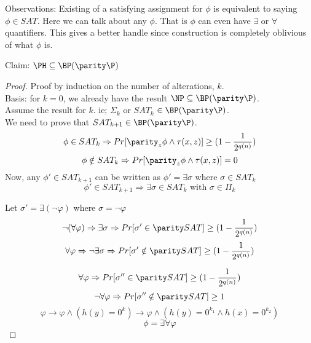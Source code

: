 \documentclass[11pt]{article}
\begin{document}
Observations: Existing of a satisfying assignment for $\phi$ is
equivalent to saying $\phi\in SAT$. Here we can talk about any
$\phi$. That is $\phi$ can even have $\exists$ or $\forall$
quantifiers. This gives a better handle since construction is
completely oblivious of what $\phi$ is.

Claim: $\PH\subseteq\BP(\parity\P)$
\begin{proof} Proof by induction on the number of alterations, $k$.\\
  Basis: for $k=0$, we already have the result
  $\NP\subseteq\BP(\parity\P)$.\\ Assume the result for $k$. ie;
  $\Sigma_k$ or $SAT_k$ $\in \BP(\parity\P)$.\\ We need to prove that
  $SAT_{k+1}\in \BP(\parity\P)$.
$$\phi\in SAT_k\Rightarrow Pr[\parity_z\phi\land\tau(x,z)]\geq(1-\frac{1}{2^{q(n)}})$$
$$\phi\notin SAT_k\Rightarrow Pr[\parity_z\phi\land\tau(x,z)]=0$$
Now, any $\phi '\in SAT_{k+1}$ can be written as $\phi
'=\exists\sigma$ where $\sigma\in SAT_k$
$$\phi '\in SAT_{k+1}\Rightarrow\exists\sigma\in SAT_k\mbox{ with } \sigma\in\Pi_k$$

Let $\sigma '=\exists(\lnot\varphi)$ where $\sigma=\lnot\varphi$\\
$$\lnot(\forall\varphi)\Rightarrow\exists\sigma\Rightarrow Pr[\sigma '\in\parity SAT]\geq (1-\frac{1}{2^{q(n)}})$$
$$\forall\varphi\Rightarrow\lnot\exists\sigma\Rightarrow Pr[\sigma '\notin\parity SAT]\geq (1-\frac{1}{2^{q(n)}})$$

$$\forall\varphi\Rightarrow Pr[\sigma ''\in\parity SAT]\geq (1-\frac{1}{2^{q(n)}})$$
$$\lnot\forall\varphi\Rightarrow Pr[\sigma ''\notin\parity SAT]\geq 1$$
$$\varphi\rightarrow\varphi\land(h(y)=0^k)\rightarrow\varphi\land(h(y)=0^{k_1}\land h(x)=0^{k_2})$$
$$\phi=\exists\forall\varphi$$

\end{proof}
\end{document}

